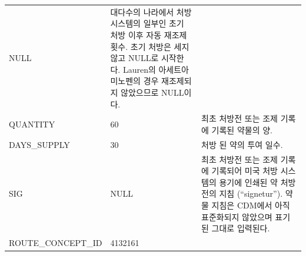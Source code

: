 \documentclass[10.5pt]{book}
\theoremstyle{definition}
\theoremstyle{definition}
\theoremstyle{definition}
\theoremstyle{remark}
\begin{document}
\begin{longtable}[]{@{}lll@{}}
\begin{minipage}[t]{0.16\columnwidth}
NULL\strut
\end{minipage} & \begin{minipage}[t]{0.48\columnwidth}\raggedright\strut
대다수의 나라에서 처방 시스템의 일부인 초기 처방 이후 자동 재조제 횟수.
초기 처방은 세지 않고 NULL로 시작한다. Lauren의 아세트아미노펜의 경우
재조제되지 않았으므로 NULL이다.\strut
\end{minipage}\tabularnewline
\begin{minipage}[t]{0.28\columnwidth}\raggedright\strut
QUANTITY\strut
\end{minipage} & \begin{minipage}[t]{0.16\columnwidth}\raggedright\strut
60\strut
\end{minipage} & \begin{minipage}[t]{0.48\columnwidth}\raggedright\strut
최초 처방전 또는 조제 기록에 기록된 약물의 양.\strut
\end{minipage}\tabularnewline
\begin{minipage}[t]{0.28\columnwidth}\raggedright\strut
DAYS\_SUPPLY\strut
\end{minipage} & \begin{minipage}[t]{0.16\columnwidth}\raggedright\strut
30\strut
\end{minipage} & \begin{minipage}[t]{0.48\columnwidth}\raggedright\strut
처방 된 약의 투여 일수.\strut
\end{minipage}\tabularnewline
\begin{minipage}[t]{0.28\columnwidth}\raggedright\strut
SIG\strut
\end{minipage} & \begin{minipage}[t]{0.16\columnwidth}\raggedright\strut
NULL\strut
\end{minipage} & \begin{minipage}[t]{0.48\columnwidth}\raggedright\strut
최초 처방전 또는 조제 기록에 기록되어 미국 처방 시스템의 용기에 인쇄된
약 처방전의 지침 (``signetur''). 약물 지침은 CDM에서 아직 표준화되지
않았으며 표기된 그대로 입력된다.\strut
\end{minipage}\tabularnewline
\begin{minipage}[t]{0.28\columnwidth}\raggedright\strut
ROUTE\_CONCEPT\_ID\strut
\end{minipage} & \begin{minipage}[t]{0.16\columnwidth}\raggedright\strut
4132161\strut
\end{minipage} & \begin{minipage}[t]{0.48\columnwidth}\raggedright\strut

\end{minipage}
\end{longtable}
\end{document}
